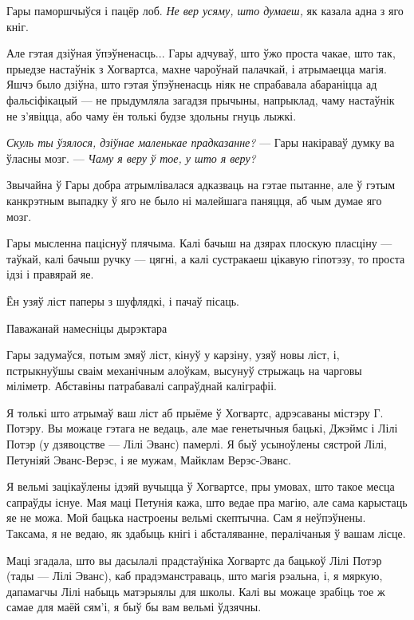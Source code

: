 Гары паморшчыўся і пацёр лоб. \emph{Не вер усяму, што думаеш,} як казала адна з яго кніг.

Але гэтая дзіўная ўпэўненасць... Гары адчуваў, што ўжо проста чакае, што так, прыедзе настаўнік з 
Хогвартса, махне чароўнай палачкай, і атрымаецца магія. Яшчэ было дзіўна, што гэтая ўпэўненасць
ніяк не спрабавала абараніцца ад фальсіфікацый --- не прыдумляла загадзя прычыны, напрыклад,
чаму настаўнік не з'явіцца, або чаму ён толькі будзе здольны гнуць лыжкі.

\emph{Скуль ты ўзялося, дзіўнае маленькае прадказанне?} --- Гары накіраваў думку ва ўласны мозг. ---
\emph{Чаму я веру ў тое, у што я веру?}

Звычайна ў Гары добра атрымлівалася адказваць на гэтае пытанне, але ў гэтым канкрэтным выпадку ў 
яго не было ні малейшага паняцця, аб чым думае яго мозг.

Гары мысленна паціснуў плячыма. Калі бачыш на дзярах плоскую пласціну --- таўкай, калі бачыш ручку
--- цягні, а калі сустракаеш цікавую гіпотэзу, то проста ідзі і правярай яе.

Ён узяў ліст паперы з шуфлядкі, і пачаў пісаць.

\medskip

{\hpFontFasthand{}Паважанай намесніцы дырэктара}

\medskip


Гары задумаўся, потым змяў ліст, кінуў у карзіну, узяў новы ліст, і, пстрыкнуўшы сваім механічным
алоўкам, высунуў стрыжаць на чарговы міліметр. Абставіны патрабавалі сапраўднай каліграфіі.

\begin{writtenNoteCursive}

Я толькі што атрымаў ваш ліст аб прыёме ў Хогвартс, адрэсаваны містэру Г. Потэру. Вы можаце
гэтага не ведаць, але мае генетычныя бацькі, Джэймс і Лілі Потэр (у дзявоцстве --- Лілі Эванс)
памерлі. Я быў усыноўлены сястрой Лілі, Петуніяй Эванс-Верэс, і яе мужам, Майклам Верэс-Эванс.

Я вельмі зацікаўлены ідэяй вучыцца ў Хогвартсе, пры умовах, што такое месца сапраўды існуе.
Мая маці Петунія кажа, што ведае пра магію, але сама карыстаць яе не можа. Мой бацька настроены
вельмі скептычна. Сам я неўпэўнены. Таксама, я не ведаю, як здабыць кнігі і абсталяванне,
пералічаныя ў вашам лісце.

Маці згадала, што вы дасылалі прадстаўніка Хогвартс да бацькоў Лілі Потэр (тады --- Лілі Эванс),
каб прадэманстраваць, што магія рэальна, і, я мяркую, дапамагчы Лілі набыць матэрыялы для школы.
Калі вы можаце зрабіць тое ж самае для маёй сям'і, я быў бы вам вельмі ўдзячны. 



\end{writtenNoteCursive}


